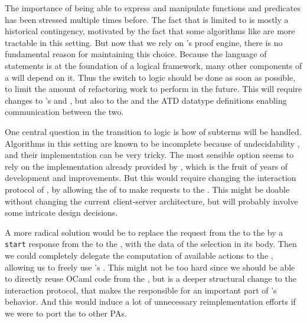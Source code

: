 The importance of being able to express and manipulate  functions
and predicates has been stressed multiple times before. The fact that  is
limited to  is mostly a historical contingency, motivated by
the fact that some algorithms like  are more tractable in this
setting. But now that we rely on 's proof engine, there is no fundamental
reason for maintaining this choice. Because the language of statements is at the
foundation of a logical framework, many other components of a 
will depend on it. Thus the switch to  logic should be done as soon
as possible, to limit the amount of refactoring work to perform in the future.
This will require changes to 's  and ,
but also to the   and the ATD datatype definitions enabling
communication between the two.

One central question in the transition to  logic is how 
of subterms will be handled. Algorithms in this setting are known to be
incomplete because of undecidability , and
their implementation can be very tricky. The most sensible option seems to rely
on the implementation already provided by , which is the fruit of years of
development and improvements. But this would require changing the interaction
protocol of , by allowing the  of  to
make  requests to the . This might be doable without
changing the current client-server architecture, but will probably involve some
intricate design decisions.

A more radical solution would be to replace the  request from
the  to the  by a \texttt{start} response
from the  to the , with the data of the
selection in its body. Then we could completely delegate the computation of
available actions to the , allowing us to freely use 's
. This might not be too hard since we should be able to directly
reuse OCaml code from the , but is a deeper structural change
to the interaction protocol, that makes the  responsible for an
important part of 's behavior. And this would induce a lot of unnecessary
reimplementation efforts if we were to port the  to other PAs.

